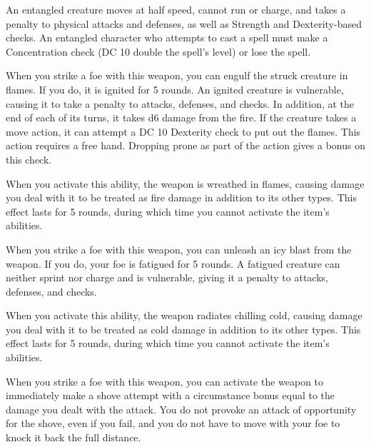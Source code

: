 An entangled creature moves at half speed, cannot run or charge, and takes a  penalty to physical attacks and defenses, as well as Strength and Dexterity-based checks. An entangled character who attempts to cast a spell must make a Concentration check (DC 10 \add double the spell's level) or lose the spell.


 When you strike a foe with this weapon, you can engulf the struck creature in flames. If you do, it is ignited for 5 rounds. An ignited creature is vulnerable, causing it to take a  penalty to attacks, defenses, and checks. In addition, at the end of each of its turns, it takes d6 damage from the fire. If the creature takes a move action, it can attempt a DC 10 Dexterity check to put out the flames. This action requires a free hand. Dropping prone as part of the action gives a  bonus on this check.

When you activate this ability, the weapon is wreathed in flames, causing damage you deal with it to be treated as fire damage in addition to its other types. This effect lasts for 5 rounds, during which time you cannot activate the item's abilities.


 When you strike a foe with this weapon, you can unleash an icy blast from the weapon. If you do, your foe is fatigued for 5 rounds. A fatigued creature can neither sprint nor charge and is vulnerable, giving it a  penalty to attacks, defenses, and checks.

When you activate this ability, the weapon radiates chilling cold, causing damage you deal with it to be treated as cold damage in addition to its other types. This effect lasts for 5 rounds, during which time you cannot activate the item's abilities.


 When you strike a foe with this weapon, you can activate the weapon to immediately make a shove attempt with a circumstance bonus equal to the damage you dealt with the attack. You do not provoke an attack of opportunity for the shove, even if you fail, and you do not have to move with your foe to knock it back the full distance.

